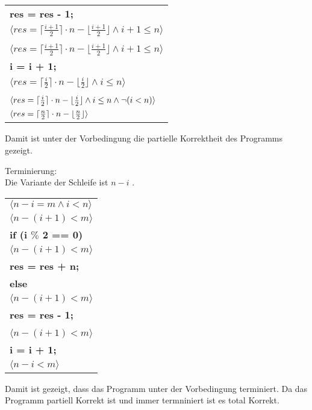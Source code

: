 \documentclass[12pt]{article}
\DeclarePairedDelimiter\ceil{\lceil}{\rceil}
\DeclarePairedDelimiter\floor{\lfloor}{\rfloor}
\begin{document}
\begin{center}
\begin{tabular}{l}
    \quad \quad \quad \quad \quad \textbf{res = res - 1;}\\
    \quad \quad \quad \quad$\langle res = \lceil \frac{i+1}{2}\rceil \cdot n - \lfloor\frac{i+1}{2} \rfloor \wedge i+1 \leq n \rangle$\\
    \quad \quad \quad \pmb{\}}\\
    \quad \quad$\langle res = \lceil \frac{i+1}{2}\rceil \cdot n - \lfloor\frac{i+1}{2} \rfloor \wedge i+1 \leq n \rangle$\\
    \quad \quad \quad \textbf{i = i + 1;}\\
    \quad \quad$\langle res = \lceil \frac{i}{2}\rceil \cdot n - \lfloor\frac{i}{2} \rfloor \wedge i \leq n\rangle$\\
    \quad \pmb{\}}\\
    $\langle res = \lceil \frac{i}{2}\rceil \cdot n - \floor{\frac{i}{2}} \wedge i \leq n \wedge \neg(i<n) \rangle$\\
    $\langle res = \ceil{\frac{n}{2}} \cdot n - \floor{\frac{n}{2}} \rangle$\\
\end{tabular}
\bigbreak
Damit ist unter der Vorbedingung die partielle Korrektheit des Programms gezeigt.
\pagebreak

    Terminierung:\\
    Die Variante der Schleife ist $n - i$ .
    \bigbreak
    \begin{tabular}{l}
        $\langle n-i=m \wedge i < n \rangle$\\
        $\langle n-(i+1)<m \rangle$\\
        \quad \textbf{if (i $\%$ 2 == 0)} \pmb{\{} \\
        \quad \quad $\langle n-(i+1)<m \rangle$\\
        \quad \quad \quad \textbf{res = res + n;}\\
        \quad \pmb{\}} \textbf{else} \pmb{\{} \\
        \quad \quad $\langle n-(i+1)<m \rangle$\\
        \quad \quad \quad \textbf{res = res - 1;}\\
        \quad \pmb{\}}\\
        $\langle n-(i+1)<m \rangle$\\
        \quad \textbf{i = i + 1;}\\
        $\langle n-i<m \rangle$
    \end{tabular}
    \bigbreak
    Damit ist gezeigt, dass das Programm unter der Vorbedingung terminiert.
    \bigbreak
    Da das Programm partiell Korrekt ist und immer termniniert ist es total Korrekt.
\end{center}
\end{document}
